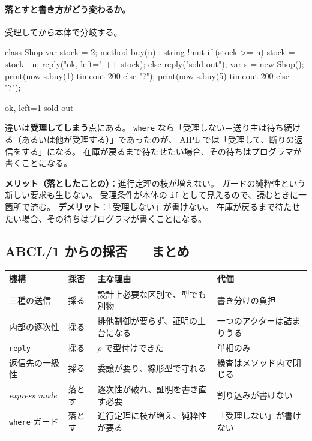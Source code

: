 \documentclass[11pt,a4paper]{ltjsarticle}
\theoremstyle{definition}
\theoremstyle{remark}
\begin{document}
\paragraph{落とすと書き方がどう変わるか。}
受理してから本体で分岐する。

\begin{aipl}
class Shop {
  var stock = 2;
  method buy(n) : string !{mut} {
    if (stock >= n) { stock = stock - n; reply("ok, left=" ++ stock); }
    else { reply("sold out"); }
  }
}
var s = new Shop();
print(now s.buy(1) timeout 200 else "?");
print(now s.buy(5) timeout 200 else "?");
\end{aipl}
\begin{term}
ok, left=1
sold out
\end{term}

違いは\textbf{受理してしまう}点にある。
\texttt{where} なら「受理しない＝送り主は待ち続ける（あるいは他が受理する）」であったのが、
AIPL では「受理して、断りの返信をする」になる。
在庫が戻るまで待たせたい場合、その待ちはプログラマが書くことになる。


\textbf{メリット（落としたことの）}：進行定理の枝が増えない。
ガードの純粋性という新しい要求も生じない。
受理条件が本体の \texttt{if} として見えるので、読むときに一箇所で済む。
\textbf{デメリット}：「受理しない」が書けない。
在庫が戻るまで待たせたい場合、その待ちはプログラマが書くことになる。

\subsection{ABCL/1 からの採否 --- まとめ}

\begin{center}
\small
\begin{tabular}{p{}p{}p{}p{}}
\toprule
機構 & 採否 & 主な理由 & 代価 \\
\midrule
三種の送信 & 採る & 設計上必要な区別で、型でも別物 & 書き分けの負担 \\
内部の逐次性 & 採る & 排他制御が要らず、証明の土台になる & 一つのアクターは詰まりうる \\
\texttt{reply} & 採る & $\rho$ で型付けできた & 単相のみ \\
返信先の一級性 & 採る & 委譲が要り、線形型で守れる & 検査はメソッド内で閉じる \\
\addlinespace
\textit{express mode} & 落とす & 逐次性が破れ、証明を書き直す必要 & 割り込みが書けない \\
\texttt{where} ガード & 落とす & 進行定理に枝が増え、純粋性が要る & 「受理しない」が書けない \\
\bottomrule
\end{tabular}
\end{center}
\end{document}
